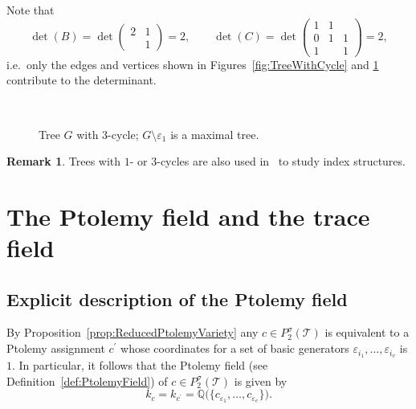 \documentclass[12pt]{amsart}
\theoremstyle{definition}
\newtheorem{remark}[theorem]{Remark}
\numberwithin{equation}{section}
\def\Q{\mathbb{Q}}
\def\T{\mathcal{T}}
\begin{document}
Note that 
\begin{equation}
\det(B)=\det\begin{pmatrix}2&1\\&1\end{pmatrix}=2,\qquad \det(C)=\det\begin{pmatrix}1&1&\\0&1&1\\1&&1\end{pmatrix}=2,
\end{equation}
i.e.~only the edges and vertices shown in Figures~\ref{fig:TreeWithCycle} and \ref{fig:TreeWithThreeCycle} contribute to the determinant.
\begin{figure}[htb]
\centering
\begin{minipage}[c]{0.45\textwidth}
\centering
\scalebox{1}{}
\end{minipage}
\hfill
\begin{minipage}[c]{0.45\textwidth}
\centering

\end{minipage}
\\
\begin{minipage}[t]{0.45\textwidth}
\caption{Tree $G$ with $1$-cycle; $G\setminus\varepsilon_1$ is a maximal tree.}\label{fig:TreeWithCycle}
\end{minipage}
\begin{minipage}[t]{0.45\textwidth}
\caption{Tree $G$ with $3$-cycle; $G\setminus\varepsilon_1$ is a maximal tree.}\label{fig:TreeWithThreeCycle}
\end{minipage}
\end{figure}

\begin{remark}
Trees with $1$- or $3$-cycles are also used in~\cite[Sec.4.6]{GHRS} to study index structures.
\end{remark}


\section{The Ptolemy field and the trace field}
\subsection{Explicit description of the Ptolemy field}
By Proposition~\ref{prop:ReducedPtolemyVariety} any $c\in P^\sigma_2(\T)$ is equivalent to a Ptolemy assignment $c^\prime$ whose coordinates for a set of basic generators $\varepsilon_{i_1},\dots,\varepsilon_{i_v}$ is $1$. In particular, it follows that the Ptolemy field (see Definition~\ref{def:PtolemyField}) of $c\in P^\sigma_2(\T)$ is given by
\begin{equation}\label{eq:kc}
k_c=k_{c^{\prime}}=\Q\big(\big\{c_{\varepsilon_1},\dots,c_{\varepsilon_e}\big\}\big).
\end{equation}
\end{document}
